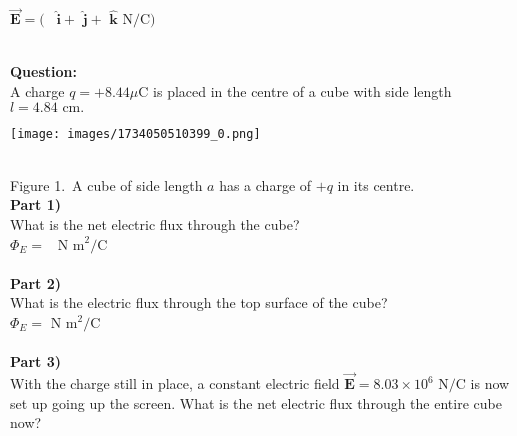 \documentclass[addpoints,12pt, margin-left=35px]{exam}
\begin{document}
$\mathbf{\vec{E}} = ($  \underline{\hspace{3cm}}  $ \mathbf{\hat{i}} + $  \underline{\hspace{3cm}}  $\mathbf{\hat{j}} + $ \underline{\hspace{3cm}}  $\mathbf{\hat{k}} \text{ N/C) }$ \\

\\

\newpage

\textbf{Question:}\\

A charge $q = + {8.44} \mu \text{C}$ is placed in the centre of a cube with side length $l = {4.84} \text{ cm.}$\\

\begin{center}
\texttt{[image: images/1734050510399\_0.png]}
\end{center}\\

Figure 1. A cube of side length $a$ has a charge of $+q$ in its centre.\\

\textbf{Part 1)}\\

What is the net electric flux through the cube?\\

$ \Phi_E = $  \underline{\hspace{3cm}}  $\text{N m}^2 \text{/C}$ \\

\\

\textbf{Part 2)}\\

What is the electric flux through the top surface of the cube?\\

$ \Phi_E = $  \underline{\hspace{3cm}}  $\text{N m}^2 \text{/C}$ \\

\\

\textbf{Part 3)}\\

With the charge still in place, a constant electric field $\mathbf{\vec{E}} = {8.03 \times 10^{6}} \text{ N/C}$ is now set up going up the screen. What is the net electric flux through the entire cube now?\\
\end{document}
